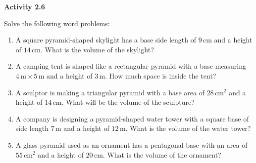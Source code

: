  \vspace{1ex}
\noindent\textbf{Activity 2.6}

\vspace{0.75ex}


Solve the following word problems:
\begin{enumerate}[noitemsep, label = \color{blue}\arabic*. ]
    \item A square pyramid-shaped skylight has a base side length of \(9 \, \text{cm}\) and a height of \(14 \, \text{cm}\). What is the volume of the skylight?
    
    \item A camping tent is shaped like a rectangular pyramid with a base measuring \(4 \, \text{m} \times 5 \, \text{m}\) and a height of \(3 \, \text{m}\). How much space is inside the tent?
    
    \item A sculptor is making a triangular pyramid with a base area of \(28 \, \text{cm}^2\) and a height of \(14 \, \text{cm}\). What will be the volume of the sculpture?
    
    \item A company is designing a pyramid-shaped water tower with a square base of side length \(7 \, \text{m}\) and a height of \(12 \, \text{m}\). What is the volume of the water tower?
    
    \item A glass pyramid used as an ornament has a pentagonal base with an area of \(55 \, \text{cm}^2\) and a height of \(20 \, \text{cm}\). What is the volume of the ornament?
    
    
    
    
    
\end{enumerate}


